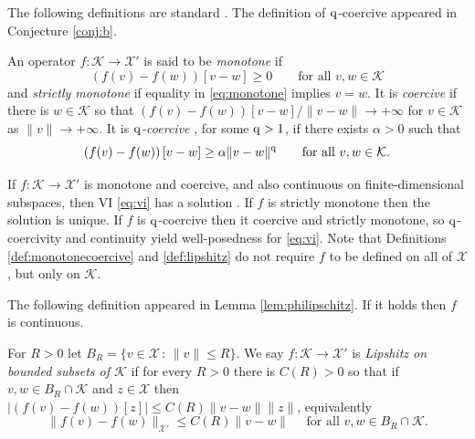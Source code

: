 \documentclass[hidelinks,onefignum,onetabnum,final]{siamart220329}  %
\newcommand{\cK}{\mathcal{K}}
\newcommand{\cX}{\mathcal{X}}
\newcommand{\qq}{{\text{\textnormal{q}}}}
\begin{document}
The following definitions are standard \cite[Chapter III]{KinderlehrerStampacchia1980}.  The definition of $\qq$-coercive appeared in Conjecture \ref{conj:b}.

\begin{definition} \label{def:monotonecoercive}
An operator $f:\cK \to \cX'$ is said to be \emph{monotone} if
\begin{equation}
\left(f(v)-f(w)\right)[v-w] \ge 0 \qquad \text{for all } v,w \in \cK \label{eq:monotone}
\end{equation}
and \emph{strictly monotone} if equality in \eqref{eq:monotone} implies $v=w$.  It is \emph{coercive} if there is $w\in \cK$ so that $\left(f(v)-f(w)\right)[v-w]/\|v-w\| \to +\infty$ for $v \in \cK$ as $\|v\| \to +\infty$.  It is \emph{$\qq$-coercive} \cite{Bueler2021conservation}, for some $\qq>1$, if there exists $\alpha>0$ such that
\begin{equation}
\left(f(v)-f(w)\right)[v-w] \ge \alpha \|v-w\|^\qq \qquad \text{for all } v,w \in \cK. \label{eq:qcoercive}
\end{equation}
\end{definition}

If $f:\cK \to \cX'$ is monotone and coercive, and also continuous on finite-dimensional subspaces, then VI \eqref{eq:vi} has a solution \cite[Corollary III.1.8]{KinderlehrerStampacchia1980}.  If $f$ is strictly monotone then the solution is unique.  If $f$ is $\qq$-coercive then it coercive and strictly monotone, so $\qq$-coercivity and continuity yield well-posedness for \eqref{eq:vi}.  Note that Definitions \ref{def:monotonecoercive} and \ref{def:lipshitz} do not require $f$ to be defined on all of $\cX$, but only on $\cK$.  
  
The following definition appeared in Lemma \ref{lem:philipschitz}.  If it holds then $f$ is continuous.

\begin{definition} \label{def:lipshitz}
For $R>0$ let $B_R = \{v\in \cX\,:\,\|v\|\le R\}$.  We say $f:\cK \to \cX'$ is \emph{Lipshitz on bounded subsets of $\cK$} if for every $R>0$ there is $C(R)>0$ so that if $v,w \in B_R \cap \cK$ and $z\in\cX$ then $|\left(f(v)-f(w)\right)[z]| \le C(R) \|v-w\| \|z\|$, equivalently
\begin{equation}
\|f(v)-f(w)\|_{\cX'} \le C(R) \|v-w\| \quad \text{ for all } v,w \in B_R \cap \cK.  \label{eq:liponbounded}
\end{equation}
\end{definition}
\end{document}
